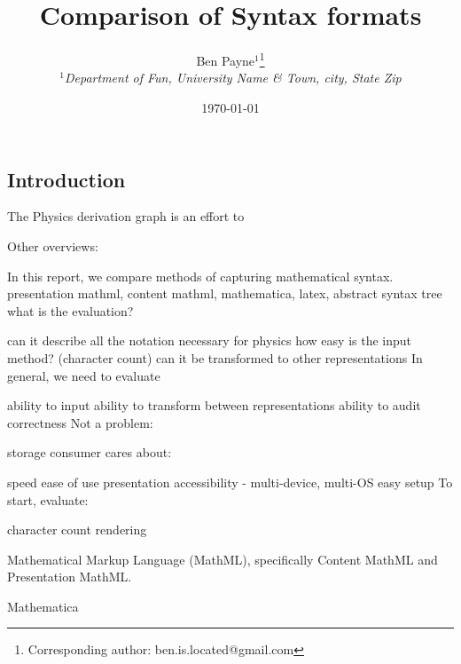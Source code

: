 \documentclass{article}
\begin{document}
\title{Comparison of Syntax formats}

\author{Ben Payne$^{1}$\footnote{Corresponding author: ben.is.located@gmail.com}\\
{\it $^{1}$Department of Fun, University Name \& Town, city, State Zip}}

\date{\today}


\maketitle %
\begin{multicols}{2}



\section{Introduction}

The Physics derivation graph is an effort to 

Other overviews:

In this report, we compare methods of capturing mathematical syntax. 
presentation mathml, content mathml, mathematica, latex, abstract syntax tree
what is the evaluation?

can it describe all the notation necessary for physics
how easy is the input method? (character count)
can it be transformed to other representations
In general, we need to evaluate

ability to input
ability to transform between representations
ability to audit correctness
Not a problem:

storage
consumer cares about:

speed
ease of use
presentation
accessibility - multi-device, multi-OS
easy setup
To start, evaluate:

character count
rendering

Mathematical Markup Language (MathML)\cite{2014_MathML}, specifically Content MathML and Presentation MathML.

Mathematica\cite{2014_mathematica}



\end{multicols}
\end{document}
